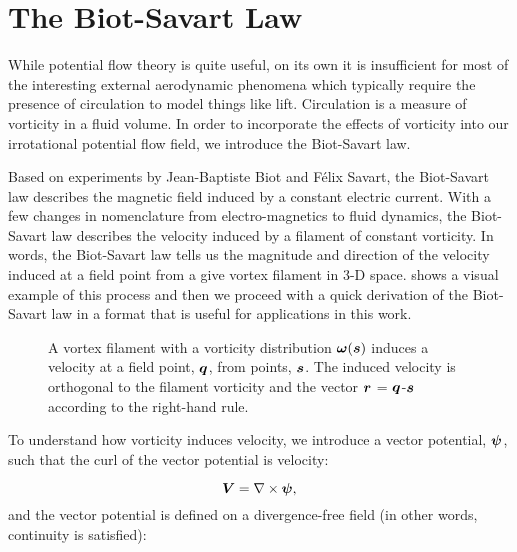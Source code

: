 \section{The Biot-Savart Law}
\label{sec:biot-savart}

While potential flow theory is quite useful, on its own it is insufficient for most of the interesting external aerodynamic phenomena which typically require the presence of circulation to model things like lift.
%
Circulation is a measure of vorticity in a fluid volume.
%
In order to incorporate the effects of vorticity into our irrotational potential flow field, we introduce the Biot-Savart law.

Based on experiments by Jean-Baptiste Biot and F\'elix Savart, the Biot-Savart law describes the magnetic field induced by a constant electric current.
%
With a few changes in nomenclature from electro-magnetics to fluid dynamics, the Biot-Savart law describes the velocity induced by a filament of constant vorticity.
%
In words, the Biot-Savart law tells us the magnitude and direction of the velocity induced at a field point from a give vortex filament in 3-D space.
%
 shows a visual example of this process and then we proceed with a quick derivation of the Biot-Savart law in a format that is useful for applications in this work.

\begin{figure}[h!]
    \centering
        
        \caption[Visual example of Biot-Savart Law.]{A vortex filament with a vorticity distribution \(\bm{\omega}(\bm{s})\) induces a velocity at a field point, \(\bm{q}\), from points, \(\bm{s}\). The induced velocity is orthogonal to the filament vorticity and the vector \(\bm{r}\) = \(\bm{q}\)-\(\bm{s}\) according to the right-hand rule.}
    \label{fig:biot_savart}
\end{figure}



To understand how vorticity induces velocity, we introduce a vector potential, \(\bm{\psi}\), such that the curl of the vector potential is velocity:

\begin{equation}
    \label{eqn:velfromstream}
    \bm{V} = \nabla \times \bm{\psi},
\end{equation}
%
and the vector potential is defined on a divergence-free field (in other words, continuity is satisfied):

